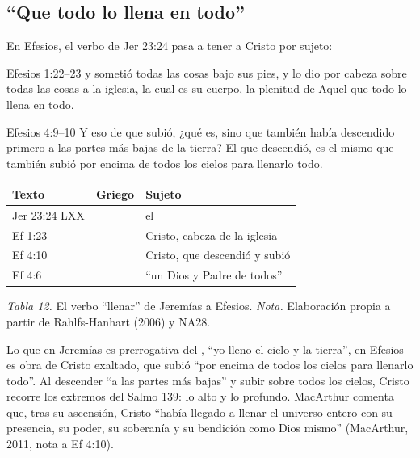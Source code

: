 \subsection{“Que todo lo llena en todo”}

En Efesios, el verbo de Jer 23:24 pasa a tener a Cristo por sujeto:

\begin{verso}{Efesios 1:22–23}
y sometió todas las cosas bajo sus pies, y lo dio por cabeza sobre todas las cosas a la iglesia, la cual es su cuerpo, la plenitud de Aquel que todo lo llena en todo.
\end{verso}
\begin{verso}{Efesios 4:9–10}
Y eso de que subió, ¿qué es, sino que también había descendido primero a las partes más bajas de la tierra? El que descendió, es el mismo que también subió por encima de todos los cielos para llenarlo todo.
\end{verso}

\begin{center}\small\renewcommand{\arraystretch}{1.22}
\begin{tabular}{@{}L{2.2cm}L{6.4cm}L{5.4cm}@{}}
\toprule
\textbf{Texto} & \textbf{Griego} & \textbf{Sujeto} \\ \midrule
Jer 23:24 LXX &  & el \SENOR{} \\
Ef 1:23 &  & Cristo, cabeza de la iglesia \\
Ef 4:10 &  & Cristo, que descendió y subió \\
Ef 4:6 &  & ``un Dios y Padre de todos'' \\
\bottomrule
\end{tabular}\par
{\footnotesize\color{gris}\textit{Tabla 12.} El verbo ``llenar'' de Jeremías a Efesios. \textit{Nota.} Elaboración propia a partir de Rahlfs-Hanhart (2006) y NA28.}
\end{center}

Lo que en Jeremías es prerrogativa del \SENOR{}, ``yo lleno el cielo y la tierra'', en Efesios es obra de Cristo exaltado, que subió ``por encima de todos los cielos para llenarlo todo''. Al descender ``a las partes más bajas'' y subir sobre todos los cielos, Cristo recorre los extremos del Salmo 139: lo alto y lo profundo. MacArthur comenta que, tras su ascensión, Cristo ``había llegado a llenar el universo entero con su presencia, su poder, su soberanía y su bendición como Dios mismo'' (MacArthur, 2011, nota a Ef 4:10).


